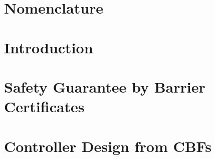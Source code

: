 
\graphicspath{{figures/}}


	






\setcounter{page}{1}
\renewcommand{\thepage}{\Roman{page}}




\setlength\parskip{0ex}
\tableofcontents
\setlength\parskip{1ex}

\chapter*{Nomenclature}\label{chap:acronym}
\printglossary[style=mcoltree,title=Glossary] %
\printglossary[type=\acronymtype,style=glossary2col] %
\printglossary[type=symbols,style=altlong4col] %



\cleardoublepage
\setcounter{page}{1}
\renewcommand{\thepage}{\arabic{page}}

\chapter{Introduction}\label{chap:intro}



\chapter{Safety Guarantee by Barrier Certificates}\label{chap:barrier_cerificates}
	

\chapter{Controller Design from CBFs}\label{chap:cbf}
	
